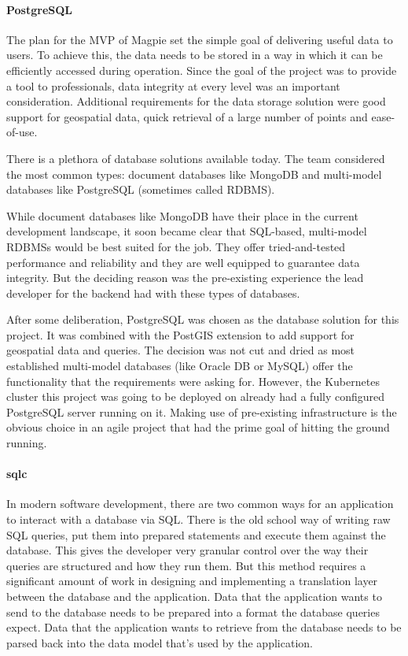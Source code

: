 \paragraph{PostgreSQL}
The plan for the MVP of Magpie set the simple goal of delivering useful data to
users. To achieve this, the data needs to be stored in a way in which it can be
efficiently accessed during operation. Since the goal of the project was to
provide a tool to professionals, data integrity at every level was an important
consideration. Additional requirements for the data storage solution were good
support for geospatial data, quick retrieval of a large number of points and
ease-of-use.

There is a plethora of database solutions available today. The team considered
the most common types: document databases like MongoDB and multi-model databases
like PostgreSQL (sometimes called RDBMS).

While document databases like MongoDB have their place in the current
development landscape, it soon became clear that SQL-based, multi-model RDBMSs
would be best suited for the job. They offer tried-and-tested performance and
reliability and they are well equipped to guarantee data integrity. But the
deciding reason was the pre-existing experience the lead developer for the
backend had with these types of databases.

After some deliberation, PostgreSQL was chosen as the database solution for this
project. It was combined with the PostGIS extension to add support for
geospatial data and queries. The decision was not cut and dried as most
established multi-model databases (like Oracle DB or MySQL) offer the
functionality that the requirements were asking for. However, the Kubernetes
cluster this project was going to be deployed on already had a fully configured
PostgreSQL server running on it. Making use of pre-existing infrastructure is
the obvious choice in an agile project that had the prime goal of hitting the
ground running.

\paragraph{sqlc}
In modern software development, there are two common ways for an application to
interact with a database via SQL. There is the old school way of writing raw SQL
queries, put them into prepared statements and execute them against the
database. This gives the developer very granular control over the way their
queries are structured and how they run them. But this method requires a
significant amount of work in designing and implementing a translation layer
between the database and the application. Data that the application wants to
send to the database needs to be prepared into a format the database queries
expect. Data that the application wants to retrieve from the database needs to
be parsed back into the data model that's used by the application.

